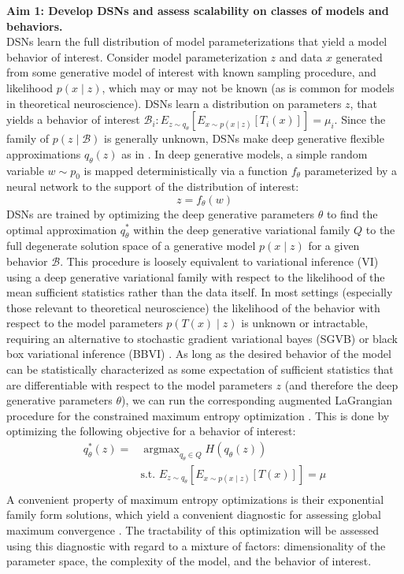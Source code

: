 \documentclass[11pt]{article}
\DeclareMathOperator*{\argmax}{argmax}
\begin{document}
\textbf{Aim 1: Develop DSNs and assess scalability on classes of models and behaviors.} \\
DSNs learn the full distribution of model parameterizations that yield a model behavior of interest.  Consider model parameterization $z$ and data $x$ generated from some generative model of interest with known sampling procedure, and likelihood $p(x \mid z)$, which may or may not be known (as is common for models in theoretical neuroscience). DSNs learn a distribution on parameters $z$, that yields a behavior of interest $\mathcal{B}_i: E_{z \sim q_\theta}\left[ E_{x\sim p(x \mid z)}\left[T_i(x)\right] \right] = \mu_i$.  Since the family of $p(z \mid \mathcal{B})$ is generally unknown, DSNs make deep generative flexible approximations $q_\theta(z)$ as in \cite{rezende2015variational}.  In deep generative models, a simple random variable $w \sim p_0$ is mapped deterministically via a function $f_\theta$ parameterized by a neural network to the support of the distribution of interest:
\begin{equation} 
z = f_{\theta}(w) 
\end{equation} 
 DSNs are trained by optimizing the deep generative parameters $\theta$ to find the optimal approximation $q_{\theta}^*$ within the deep generative variational family $Q$ to the full degenerate solution space of a generative model $p(x \mid z)$ for a given behavior $\mathcal{B}$.  This procedure is loosely equivalent to variational inference (VI) using a deep generative variational family with respect to the likelihood of the mean sufficient statistics rather than the data itself.  In most settings (especially those relevant to theoretical neuroscience) the likelihood of the behavior with respect to the model parameters $p(T(x) \mid z)$ is unknown or intractable, requiring an alternative to stochastic gradient variational bayes (SGVB) \cite{kingma2013auto} or black box variational inference (BBVI) \cite{ranganath2014black}. As long as the desired behavior of the model can be statistically characterized as some expectation of sufficient statistics that are differentiable with respect to the model parameters $z$ (and therefore the deep generative parameters $\theta$), we can run the corresponding augmented LaGrangian procedure for the constrained maximum entropy optimization \cite{loaiza2017maximum}.  This is done by optimizing the following objective for a behavior of interest:
\begin{equation}
\begin{split}
q_\theta^*(z) = & \argmax_{q_\theta \in Q} H(q_\theta(z)) \\
& \text{s.t.  } E_{z \sim q_\theta}\left[ E_{x\sim p(x \mid z)}\left[T(x)\right] \right] = \mu \\
\end{split}
\end{equation}
A convenient property of maximum entropy optimizations is their exponential family form solutions, which yield a convenient diagnostic for assessing global maximum convergence \cite{bittner2018learning}. The tractability of this optimization will be assessed using this diagnostic with regard to a mixture of factors: dimensionality of the parameter space, the complexity of the model, and the behavior of interest.
\end{document}
